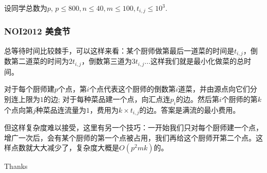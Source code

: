 \documentclass[10pt]{beamer}
\begin{document}
\begin{CJK}{UTF8}{gkai}
\begin{spacing}{1.1}
\begin{frame}
	设同学总数为$p$, $p \le 800, n \le 40, m \le 100, t_{i, j} \le 10^3$.
\end{frame}

\begin{frame}
\frametitle{NOI2012 美食节}
	总等待时间比较棘手，可以这样来看：某个厨师做第最后一道菜的时间是$t_{i, j}$，倒数第二道菜的时间为$2 t_{i, j}$，倒数第三道为$3 t_{i, j}$...这样我们就是最小化做菜的总时间。\pause

	对于每个厨师建$p$个点，第$i$个点代表这个厨师的倒数第$i$道菜，并由源点向它们分别连上限为$1$的边; 对于每种菜品建一个点，向汇点连$p_i$的边。然后第$i$个厨师的第$k$个点向第$j$种菜品连流量为$1$，费用为$k \times t_{i, j}$的边。答案是满流的最小费用。\pause

	但这样复杂度难以接受，这里有另一个技巧：一开始我们只对每个厨师建一个点，增广一次后，会有某个厨师的第一个点被占用，我们再给这个厨师开第二个点。这样点数就大大减少了，复杂度大概是$O(p^2mk)$的。
\end{frame}

\begin{frame}
\Huge{\centerline{Thanks}}
\end{frame}

\end{spacing}
\end{CJK}
\end{document}

